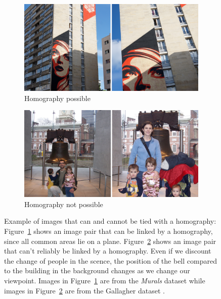 \begin{figure}[tb]
    \begin{subfigure}[t]{0.5\textwidth}
        \centering
        \includegraphics[width=\textwidth]{images/homography_possible}
        \caption{Homography possible}
        \label{fig:hom_possible}
    \end{subfigure}%
        \quad %
    \begin{subfigure}[t]{0.5\textwidth}
        \centering
        \includegraphics[width=\textwidth]{images/homography_not_possible}
        \caption{Homography not possible}
        \label{fig:hom_impossible}
    \end{subfigure}%
    \caption{Example of images that can and cannot be tied with a 
        homography: Figure~\ref{fig:hom_possible} shows an image pair 
        that can be linked by a homography, since all common areas lie 
        on a plane.  Figure~\ref{fig:hom_impossible} shows an image pair 
        that can't reliably be linked by a homography. Even if we 
        discount the change of people in the scence, the position of the 
        bell compared to the building in the background changes as we 
        change our viewpoint. Images in Figure~\ref{fig:hom_possible} 
        are from the \emph{Murals} dataset while images in 
        Figure~\ref{fig:hom_impossible} are from the Gallagher dataset 
    \cite{gallagher2008}.}
    \label{fig:homography_example}
\end{figure}

